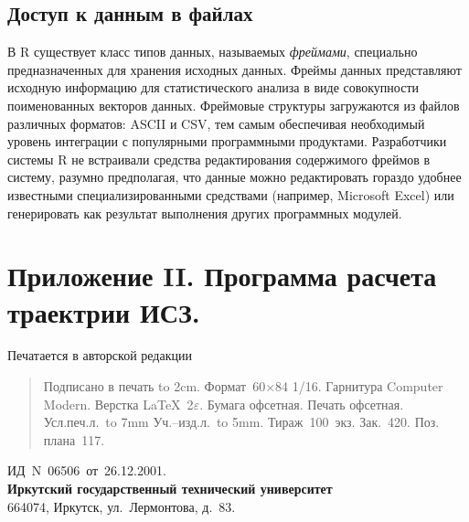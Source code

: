 \documentclass[12pt, openany, twoside]{book} %
\begin{document}
\section{Доступ к данным в файлах}
В R существует класс типов данных, называемых \emph{фреймами}, специально предназначенных для хранения исходных данных. Фреймы данных представляют исходную информацию для статистического анализа в виде совокупности поименованных векторов данных. Фреймовые структуры загружаются из файлов различных форматов: ASCII и CSV, тем самым обеспечивая необходимый уровень интеграции с популярными программными продуктами. Разработчики системы R не встраивали средства редактирования содержимого фреймов в систему, разумно предполагая, что данные можно редактировать гораздо удобнее известными специализированными средствами (например, Microsoft Excel) или генерировать как результат выполнения других программных модулей.

\chapter*{Приложение II. Программа расчета траектрии ИСЗ.}

\label{pg:lastpage}

\newpage
\thispagestyle{empty}
\hbox{}
\vfill
\begin{center}
Печатается в авторской редакции\\[1em]
\end{center}
\begin{quote}
\noindent Подписано в печать \hbox to 2cm{}.
Формат~60$\times$84 1/16. Гарнитура Computer Modern.
Верстка \LaTeX~2$\varepsilon$.
Бумага офсетная. Печать офсетная. Усл.печ.л.~\hbox to 7mm{}
Уч.--изд.л.~\hbox to 5mm{}. Тираж~100~экз. Зак.~420.
Поз. плана~117.
\end{quote}
\begin{center}
ИД~N~06506~от~26.12.2001.\\
{\bf Иркутский государственный технический университет}\\
664074, Иркутск, ул.~Лермонтова, д.~83.
\end{center}
\end{document}
